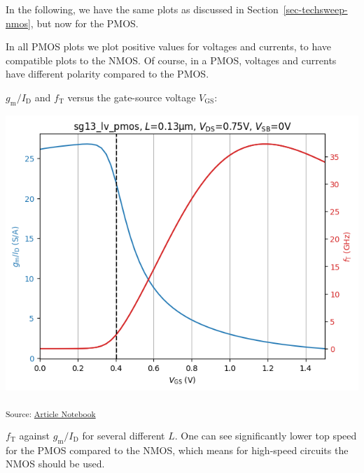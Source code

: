 \documentclass[
  a4paper,
  DIV=11,
  numbers=noendperiod]{scrartcl}
\begin{document}
In the following, we have the same plots as discussed in
Section~\ref{sec-techsweep-nmos}, but now for the PMOS.

\begin{tcolorbox}[enhanced jigsaw, arc=.35mm, leftrule=.75mm, toprule=.15mm, bottomrule=.15mm, opacityback=0, toptitle=1mm, colbacktitle=quarto-callout-note-color!10!white, colframe=quarto-callout-note-color-frame, left=2mm, titlerule=0mm, bottomtitle=1mm, coltitle=black, title=\textcolor{quarto-callout-note-color}{\faInfo}\hspace{0.5em}{Note}, breakable, rightrule=.15mm, colback=white, opacitybacktitle=0.6]

In all PMOS plots we plot positive values for voltages and currents, to
have compatible plots to the NMOS. Of course, in a PMOS, voltages and
currents have different polarity compared to the PMOS.

\end{tcolorbox}

\(g_\mathrm{m}/I_\mathrm{D}\) and \(f_\mathrm{T}\) versus the
gate-source voltage \(V_\mathrm{GS}\):

\includegraphics{index_files/figure-latex/.-sizing-techsweep_sg13_plots_pmos-cell-6-output-1.png}

\textsubscript{Source:
\href{https://iic-jku.github.io/analog-circuit-design/index.qmd.html}{Article
Notebook}}

\(f_\mathrm{T}\) against \(g_\mathrm{m}/I_\mathrm{D}\) for several
different \(L\). One can see significantly lower top speed for the PMOS
compared to the NMOS, which means for high-speed circuits the NMOS
should be used.
\end{document}
